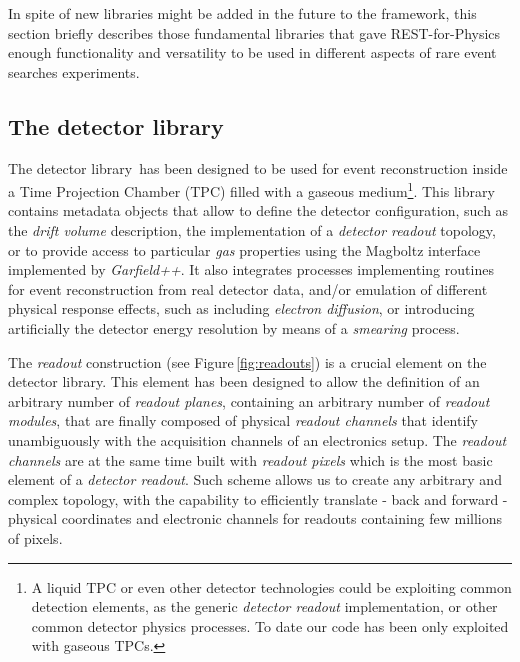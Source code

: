In spite of new libraries might be added in the future to the framework, this section briefly describes those fundamental libraries that gave REST-for-Physics enough functionality and versatility to be used in different aspects of rare event searches experiments.

\subsection{The detector library}

The detector library\,\cite{REST_Detector_Git} has been designed to be used for event reconstruction inside a Time Projection Chamber (TPC) filled with a gaseous medium\footnote{A liquid TPC or even other detector technologies could be exploiting common detection elements, as the generic \emph{detector readout} implementation, or other common detector physics processes. To date our code has been only exploited with gaseous TPCs.}. This library contains metadata objects that allow to define the detector configuration, such as the \emph{drift volume} description, the implementation of a \emph{detector readout} topology, or to provide access to particular \emph{gas} properties using the Magboltz interface implemented by \emph{Garfield++}. It also integrates processes implementing routines for event reconstruction from real detector data, and/or emulation of different physical response effects, such as including \emph{electron diffusion}, or introducing artificially the detector energy resolution by means of a \emph{smearing} process.

The \emph{readout} construction (see Figure\,\ref{fig:readouts}) is a crucial element on the detector library. This element has been designed to allow the definition of an arbitrary number of \emph{readout planes}, containing an arbitrary number of \emph{readout modules}, that are finally composed of physical \emph{readout channels} that identify unambiguously with the acquisition channels of an electronics setup. The \emph{readout channels} are at the same time built with \emph{readout pixels} which is the most basic element of a \emph{detector readout}. Such scheme allows us to create any arbitrary and complex topology, with the capability to efficiently translate - back and forward - physical coordinates and electronic channels for readouts containing few millions of pixels.

